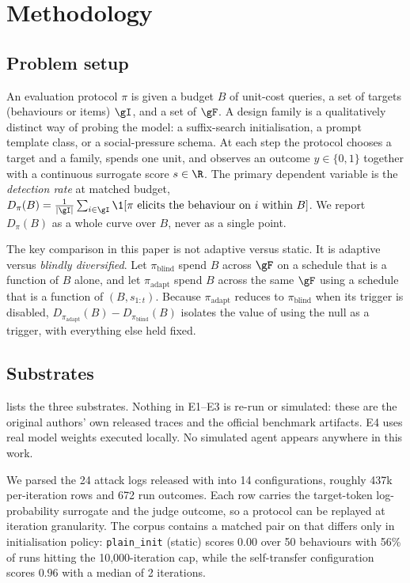 \section{Methodology}
\label{sec:method}

\subsection{Problem setup}

An evaluation protocol $\pi$ is given a budget $B$ of unit-cost queries, a set of targets
(behaviours or items) $\gI$, and a set of \families $\gF$. A design family is a qualitatively
distinct way of probing the model: a suffix-search initialisation, a prompt template class, or a
social-pressure schema. At each step the protocol chooses a target and a family, spends one unit,
and observes an outcome $y \in \{0,1\}$ together with a continuous surrogate score $s \in \R$. The
primary dependent variable is the \emph{detection rate} at matched budget,
$D_\pi(B) = \frac{1}{|\gI|}\sum_{i\in\gI} \1[\pi \text{ elicits the behaviour on } i \text{ within } B]$.
We report $D_\pi(B)$ as a whole curve over $B$, never as a single point.

The key comparison in this paper is not adaptive versus static. It is adaptive versus
\emph{blindly diversified}. Let $\pi_{\text{blind}}$ spend $B$ across $\gF$ on a schedule that is a
function of $B$ alone, and let $\pi_{\text{adapt}}$ spend $B$ across the same $\gF$ using a
schedule that is a function of $(B, s_{1:t})$. Because $\pi_{\text{adapt}}$ reduces to
$\pi_{\text{blind}}$ when its trigger is disabled, $D_{\pi_{\text{adapt}}}(B) -
D_{\pi_{\text{blind}}}(B)$ isolates the value of using the null as a trigger, with everything else
held fixed.

\subsection{Substrates}

 lists the three substrates. Nothing in E1--E3 is re-run or simulated:
these are the original authors' own released traces and the official benchmark artifacts. E4 uses
real model weights executed locally. No simulated agent appears anywhere in this work.



 We parsed the 24 attack logs released with
\citet{andriushchenko2024adaptive} into 14 configurations, roughly 437k per-iteration rows and 672
run outcomes. Each row carries the target-token log-probability surrogate and the judge outcome, so
a protocol can be replayed at iteration granularity. The corpus contains a matched pair on
\llamaseven that differs only in initialisation policy: \texttt{plain\_init} (static) scores $0.00$
over 50 behaviours with 56\% of runs hitting the 10{,}000-iteration cap, while the self-transfer
configuration scores $0.96$ with a median of 2 iterations.

